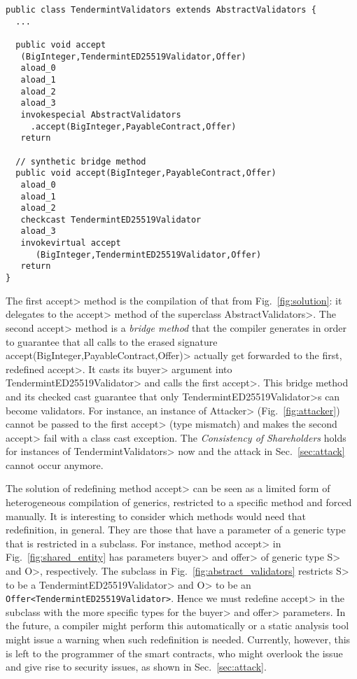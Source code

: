 \begin{lstlisting}[language=JavaBytecode]
public class TendermintValidators extends AbstractValidators {
  ...
  
  public void accept
   (BigInteger,TendermintED25519Validator,Offer)
   aload_0
   aload_1
   aload_2
   aload_3
   invokespecial AbstractValidators
     .accept(BigInteger,PayableContract,Offer)
   return

  // synthetic bridge method
  public void accept(BigInteger,PayableContract,Offer)
   aload_0
   aload_1
   aload_2
   checkcast TendermintED25519Validator
   aload_3
   invokevirtual accept
      (BigInteger,TendermintED25519Validator,Offer)
   return
}
\end{lstlisting}

\noindent
The first \<accept> method is the compilation of that from Fig.~\ref{fig:solution}:
it delegates to the \<accept> method of the superclass \<AbstractValidators>. The second
\<accept> method is a \emph{bridge method} that the compiler generates in order to guarantee
that all calls to the erased signature \<accept(BigInteger,PayableContract,Offer)> actually
get forwarded to the first, redefined \<accept>. It casts its \<buyer> argument
into \<TendermintED25519Validator> and calls the first \<accept>. This
bridge method and its checked cast guarantee that only \<TendermintED25519Validator>s
can become validators. For instance, an instance of \<Attacker> (Fig.~\ref{fig:attacker})
cannot be passed to the first \<accept> (type mismatch) and makes the second \<accept>
fail with a class cast exception. The \emph{Consistency of Shareholders} holds
for instances of \<TendermintValidators> now and the attack in Sec.~\ref{sec:attack} cannot occur
anymore.

The solution of redefining method \<accept> can be seen as a limited form of heterogeneous
compilation of generics, restricted to a specific method and forced manually.
It is interesting to consider which methods
would need that redefinition, in general. They are those that have a parameter of a generic type
that is restricted in a subclass. For instance, method \<accept> in
Fig.~\ref{fig:shared_entity} has parameters \<buyer> and \<offer> of generic type
\<S> and \<O>, respectively. The subclass in Fig.~\ref{fig:abstract_validators} restricts
\<S> to be a \<TendermintED25519Validator> and \<O> to be
an {\codesize\texttt{Offer<TendermintED25519Validator>}}. Hence we must redefine
\<accept> in the subclass with the more specific types for the \<buyer> and \<offer>
parameters. In the future, a compiler might perform this automatically or a static analysis
tool might issue a warning when such redefinition is needed. Currently, however, this is
left to the programmer of the smart contracts, who might overlook the issue
and give rise to security issues, as shown in Sec.~\ref{sec:attack}.

